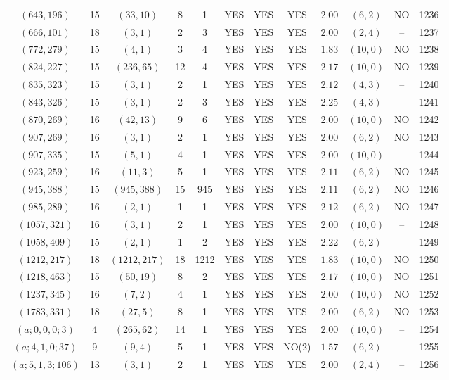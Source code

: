 \begin{longtable}{|c|c|c|c|c|c|c|c|c|c|c|c|}
$(643,196)$ & 15 & $(33,10)$ & 8 & 1 & YES & YES & YES & $2.00$ & $(6,2)$ & NO & 1236\\
$(666,101)$ & 18 & $(3,1)$ & 2 & 3 & YES & YES & YES & $2.00$ & $(2,4)$ & -- & 1237\\
$(772,279)$ & 15 & $(4,1)$ & 3 & 4 & YES & YES & YES & $1.83$ & $(10,0)$ & NO & 1238\\
$(824,227)$ & 15 & $(236,65)$ & 12 & 4 & YES & YES & YES & $2.17$ & $(10,0)$ & NO & 1239\\
$(835,323)$ & 15 & $(3,1)$ & 2 & 1 & YES & YES & YES & $2.12$ & $(4,3)$ & -- & 1240\\
$(843,326)$ & 15 & $(3,1)$ & 2 & 3 & YES & YES & YES & $2.25$ & $(4,3)$ & -- & 1241\\
$(870,269)$ & 16 & $(42,13)$ & 9 & 6 & YES & YES & YES & $2.00$ & $(10,0)$ & NO & 1242\\
$(907,269)$ & 16 & $(3,1)$ & 2 & 1 & YES & YES & YES & $2.00$ & $(6,2)$ & NO & 1243\\
$(907,335)$ & 15 & $(5,1)$ & 4 & 1 & YES & YES & YES & $2.00$ & $(10,0)$ & -- & 1244\\
$(923,259)$ & 16 & $(11,3)$ & 5 & 1 & YES & YES & YES & $2.11$ & $(6,2)$ & NO & 1245\\
$(945,388)$ & 15 & $(945,388)$ & 15 & 945 & YES & YES & YES & $2.11$ & $(6,2)$ & NO & 1246\\
$(985,289)$ & 16 & $(2,1)$ & 1 & 1 & YES & YES & YES & $2.12$ & $(6,2)$ & NO & 1247\\
$(1057,321)$ & 16 & $(3,1)$ & 2 & 1 & YES & YES & YES & $2.00$ & $(10,0)$ & -- & 1248\\
$(1058,409)$ & 15 & $(2,1)$ & 1 & 2 & YES & YES & YES & $2.22$ & $(6,2)$ & -- & 1249\\
$(1212,217)$ & 18 & $(1212,217)$ & 18 & 1212 & YES & YES & YES & $1.83$ & $(10,0)$ & NO & 1250\\
$(1218,463)$ & 15 & $(50,19)$ & 8 & 2 & YES & YES & YES & $2.17$ & $(10,0)$ & NO & 1251\\
$(1237,345)$ & 16 & $(7,2)$ & 4 & 1 & YES & YES & YES & $2.00$ & $(10,0)$ & NO & 1252\\
$(1783,331)$ & 18 & $(27,5)$ & 8 & 1 & YES & YES & YES & $2.00$ & $(6,2)$ & NO & 1253\\
$(a;0,0,0;3)$ & 4 & $(265,62)$ & 14 & 1 & YES & YES & YES & $2.00$ & $(10,0)$ & -- & 1254\\
$(a;4,1,0;37)$ & 9 & $(9,4)$ & 5 & 1 & YES & YES & NO(2) & $1.57$ & $(6,2)$ & -- & 1255\\
$(a;5,1,3;106)$ & 13 & $(3,1)$ & 2 & 1 & YES & YES & YES & $2.00$ & $(2,4)$ & -- & 1256\\

\end{longtable}

